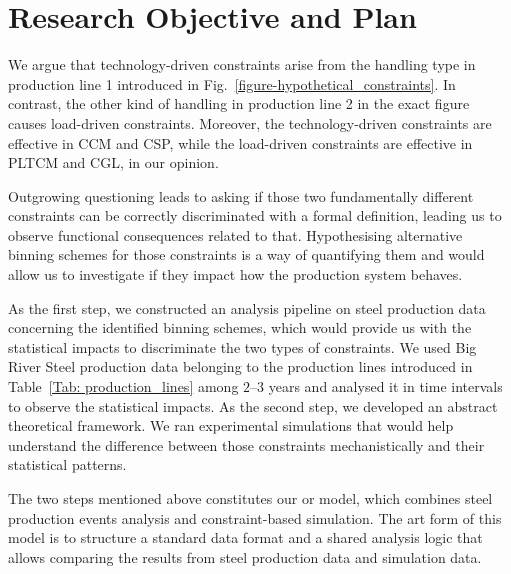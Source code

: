 \section{Research Objective and Plan}

We argue that technology-driven constraints arise from the handling type in production line 1 introduced in Fig.~\ref{figure-hypothetical_constraints}. In contrast, the other kind of handling in production line 2 in the exact figure causes load-driven constraints. Moreover, the technology-driven constraints are effective in CCM and CSP, while the load-driven constraints are effective in PLTCM and CGL, in our opinion.

Outgrowing questioning leads to asking if those two fundamentally different constraints can be correctly discriminated with a formal definition, leading us to observe functional consequences related to that. Hypothesising alternative binning schemes for those constraints is a way of quantifying them and would allow us to investigate if they impact how the production system behaves.

As the first step, we constructed an analysis pipeline on steel production data concerning the identified binning schemes, which would provide us with the statistical impacts to discriminate the two types of constraints. We used Big River Steel production data belonging to the production lines introduced in Table~\ref{Tab: production_lines} among $2$--$3$ years and analysed it in time intervals to observe the statistical impacts. As the second step, we developed an abstract theoretical framework. We ran experimental simulations that would help understand the difference between those constraints mechanistically and their statistical patterns.

The two steps mentioned above constitutes our \ac{or} model, which combines steel production events analysis and constraint-based simulation. The art form of this model is to structure a standard data format and a shared analysis logic that allows comparing the results from steel production data and simulation data.